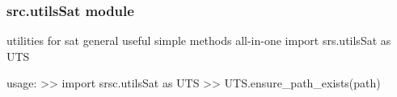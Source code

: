 \documentclass[a4paper,10pt,english]{sphinxmanual}
\begin{document}

\begin{fulllineitems}
\label{commands/apidoc/src:src.test_module.getTmpDirDEFAULT}
\end{fulllineitems}



\subsubsection{src.utilsSat module}
\label{commands/apidoc/src:src-utilssat-module}\label{commands/apidoc/src:module-src.utilsSat}
utilities for sat
general useful simple methods
all-in-one import srs.utilsSat as UTS

usage:
\textgreater{}\textgreater{} import srsc.utilsSat as UTS
\textgreater{}\textgreater{} UTS.ensure\_path\_exists(path)
\end{document}

